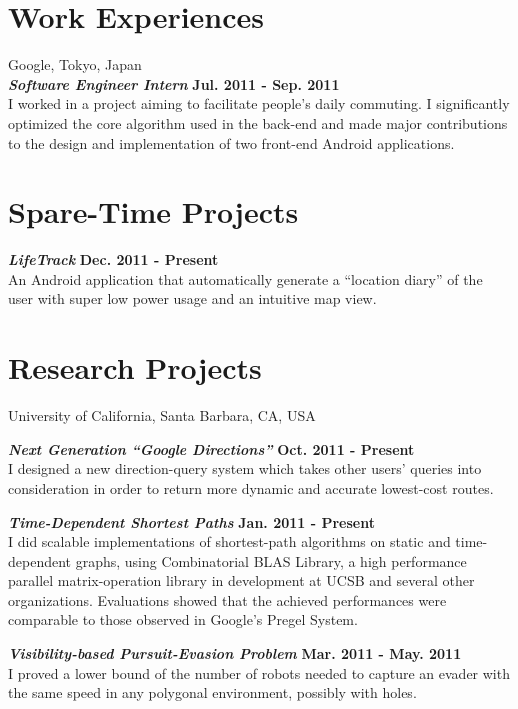 \documentclass[margin,line]{res}
\begin{document}
\begin{resume}
\section{\sc Work Experiences}
{Google}, Tokyo, Japan\\
{\bf{\em Software Engineer Intern}} \hfill {\bf Jul. 2011 - Sep. 2011}\\
I worked in a project aiming to facilitate people's daily commuting. I significantly optimized the core algorithm used in the back-end and made major contributions to the design and implementation of two front-end Android applications.

\section{\sc Spare-Time Projects}
{\bf{\em LifeTrack}}  \hfill {\bf Dec. 2011 - Present}\\
An Android application that automatically generate a ``location diary'' of the user with super low power usage and an intuitive map view.

\section{\sc Research Projects}
{University of California, Santa Barbara}, CA, USA

\vspace{-.1cm}
{\bf{\em Next Generation ``Google Directions''}}  \hfill {\bf Oct. 2011 - Present}\\
I designed a new direction-query system which takes other users' queries into consideration in order to return more dynamic and accurate lowest-cost routes.


{\bf{\em Time-Dependent Shortest Paths}}  \hfill {\bf Jan. 2011 - Present}\\
I did scalable implementations of shortest-path algorithms on static and time-dependent graphs, using Combinatorial BLAS Library, a high performance parallel matrix-operation library in development at UCSB and several other organizations. Evaluations showed that the achieved performances were comparable to those observed in Google's Pregel System.


{\bf{\em Visibility-based Pursuit-Evasion Problem}}  \hfill {\bf Mar. 2011 - May. 2011}\\
I proved a lower bound of the number of robots needed to capture an evader with the same speed in any polygonal environment, possibly with holes.



\end{resume}
\end{document}
